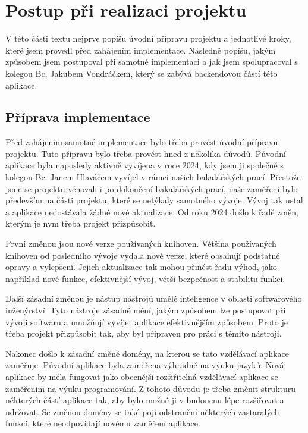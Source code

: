 \section{Postup při realizaci projektu}

V této části textu nejprve popíšu úvodní přípravu projektu a jednotlivé kroky, které jsem provedl před zahájením implementace. Následně popíšu, jakým způsobem jsem postupoval při samotné implementaci a jak jsem spolupracoval s kolegou Bc. Jakubem Vondráčkem, který se zabývá backendovou částí této aplikace.

\subsection{Příprava implementace}

Před zahájením samotné implementace bylo třeba provést úvodní přípravu projektu. Tuto přípravu bylo třeba provést hned z několika důvodů. Původní aplikace byla naposledy aktivně vyvíjena v roce 2024, kdy jsem ji společně s kolegou Bc. Janem Hlaváčem vyvíjel v rámci našich bakalářských prací. Přestože jsme se projektu věnovali i po dokončení bakalářských prací, naše zaměření bylo především na části projektu, které se netýkaly samotného vývoje. Vývoj tak ustal a aplikace nedostávala žádné nové aktualizace. Od roku 2024 došlo k řadě změn, kterým je nyní třeba projekt přizpůsobit.

První změnou jsou nové verze používaných knihoven. Většina používaných knihoven od posledního vývoje vydala nové verze, které obsahují podstatné opravy a vylepšení. Jejich aktualizace tak mohou přinést řadu výhod, jako například nové funkce, efektivnější vývoj, větší bezpečnost a stabilitu funkcí.

Další zásadní změnou je nástup nástrojů umělé inteligence v oblasti softwarového inženýrství. Tyto nástroje zásadně mění, jakým způsobem lze postupovat při vývoji softwaru a umožňují vyvíjet aplikace efektivnějším způsobem. Proto je třeba projekt přizpůsobit tak, aby byl připraven pro práci s těmito nástroji.

Nakonec došlo k zásadní změně domény, na kterou se tato vzdělávací aplikace zaměřuje. Původní aplikace byla zaměřena výhradně na výuku jazyků. Nová aplikace by měla fungovat jako obecnější rozšiřitelná vzdělávací aplikace se zaměřením na výuku programování. Z tohoto důvodu je třeba změnit strukturu některých částí aplikace tak, aby bylo možné ji v budoucnu lépe rozšiřovat a udržovat. Se změnou domény se také pojí odstranění některých zastaralých funkcí, které neodpovídají novému zaměření aplikace.

